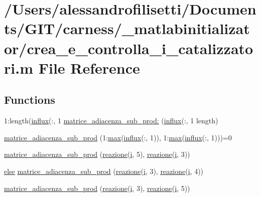 \hypertarget{a00062}{\section{/\-Users/alessandrofilisetti/\-Documents/\-G\-I\-T/carness/\-\_\-matlabinitializator/crea\-\_\-e\-\_\-controlla\-\_\-i\-\_\-catalizzatori.m File Reference}
\label{a00062}
}
\subsection*{Functions}
\begin{DoxyCompactItemize}
\item 
1\-:length(\hyperlink{a00065_a902e747aeec6b345d3a057099152f41f}{influx}(\-:, 1 \hyperlink{a00062_a195fa22a2398c6f353792d39be88e00d}{matrice\-\_\-adiacenza\-\_\-sub\-\_\-prod\-:} (\hyperlink{a00065_a902e747aeec6b345d3a057099152f41f}{influx}(\-:, 1 length)
\item 
\hyperlink{a00062_ae7da9fe2a41436b8435a4d7e5066d310}{matrice\-\_\-adiacenza\-\_\-sub\-\_\-prod} (1\-:\hyperlink{a00062_a6d9c24e62aee61f54530163edf684ae2}{max}(\hyperlink{a00065_a902e747aeec6b345d3a057099152f41f}{influx}(\-:, 1)), 1\-:\hyperlink{a00062_a6d9c24e62aee61f54530163edf684ae2}{max}(\hyperlink{a00065_a902e747aeec6b345d3a057099152f41f}{influx}(\-:, 1)))=0
\item 
\hyperlink{a00062_aae3caf6a86a43bdf9fe5a6588adce1b2}{matrice\-\_\-adiacenza\-\_\-sub\-\_\-prod} (\hyperlink{a00068_a65cf6e12ba9a8c10222f3f1f71f7c95f}{reazione}(\hyperlink{a00071_ad3efca1ea6e3333daf30719ee0501862}{i}, 5), \hyperlink{a00068_a65cf6e12ba9a8c10222f3f1f71f7c95f}{reazione}(\hyperlink{a00071_ad3efca1ea6e3333daf30719ee0501862}{i}, 3))
\item 
\hyperlink{a00031_af5946383720aa572eb93e1e63afc23c2}{else} \hyperlink{a00062_a5ea236a7441a51f71adef1c414145d3b}{matrice\-\_\-adiacenza\-\_\-sub\-\_\-prod} (\hyperlink{a00068_a65cf6e12ba9a8c10222f3f1f71f7c95f}{reazione}(\hyperlink{a00071_ad3efca1ea6e3333daf30719ee0501862}{i}, 3), \hyperlink{a00068_a65cf6e12ba9a8c10222f3f1f71f7c95f}{reazione}(\hyperlink{a00071_ad3efca1ea6e3333daf30719ee0501862}{i}, 4))
\item 
\hyperlink{a00062_a3568a7566d3871de5460f8fe96044c26}{matrice\-\_\-adiacenza\-\_\-sub\-\_\-prod} (\hyperlink{a00068_a65cf6e12ba9a8c10222f3f1f71f7c95f}{reazione}(\hyperlink{a00071_ad3efca1ea6e3333daf30719ee0501862}{i}, 3), \hyperlink{a00068_a65cf6e12ba9a8c10222f3f1f71f7c95f}{reazione}(\hyperlink{a00071_ad3efca1ea6e3333daf30719ee0501862}{i}, 5))

\end{DoxyCompactItemize}
